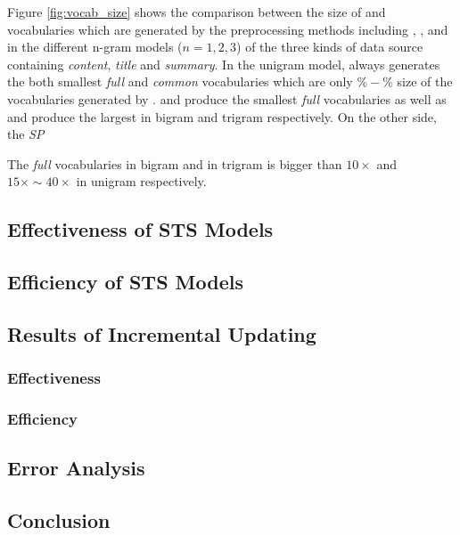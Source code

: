 Figure \ref{fig:vocab_size} shows the comparison between the size of \ifull and \icommon vocabularies which are generated by the preprocessing methods including \iSP, \iSE, \iST and \iSS in the different n-gram models ($n=1, 2, 3$) of the three kinds of data source containing \textit{content}, \textit{title} and \textit{summary}. In the unigram model, \iSS always generates the both smallest \textit{full} and \textit{common} vocabularies which are only $\%-\%$ size of the vocabularies generated by \iSP. \iSE and \iSS produce the smallest \textit{full} vocabularies as well as \iST and \iSP produce the largest in bigram and trigram respectively. On the other side, the \textit{SP}

The \textit{full} vocabularies in bigram and in trigram is bigger than $10\times$ and $15\times \sim 40\times$ in unigram respectively. 

\subsection{Effectiveness of STS Models}
\label{sec:5.2}

\subsection{Efficiency of STS Models}
\label{sec:5.3}

\subsection{Results of Incremental Updating}
\label{sec:5.4}

\subsubsection{Effectiveness}

\subsubsection{Efficiency}

\subsection{Error Analysis}
\label{sec:5.5}

\subsection{Conclusion}
\label{sec:5.6}
